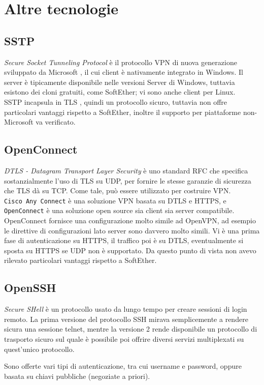 \section{Altre tecnologie}
\subsection{SSTP}
\textit{Secure Socket Tunneling Protocol} è il protocollo VPN di nuova generazione sviluppato
da Microsoft \cite{sstp}, il cui client è nativamente integrato in Windows. Il server è tipicamente
disponibile nelle versioni Server di Windows, tuttavia esistono dei cloni gratuiti, come
SoftEther; vi sono anche client per Linux.\\
SSTP incapsula in TLS , quindi un protocollo
sicuro, tuttavia non offre particolari vantaggi rispetto a SoftEther, inoltre il supporto
per piattaforme non-Microsoft va verificato.

\subsection{OpenConnect}
\textit{DTLS - Datagram Transport Layer Security} è uno standard RFC che specifica
sostanzialmente l'uso di TLS su UDP, per fornire le stesse garanzie di sicurezza che TLS dà
su TCP. Come tale, può essere utilizzato per costruire VPN.\\
\texttt{Cisco Any Connect} è una soluzione VPN basata su DTLS e HTTPS, e
\texttt{OpenConnect} è una soluzione open source sia client sia server compatibile.
OpenConnect fornisce una configurazione molto simile ad OpenVPN, ad esempio le direttive
di configurazioni lato server sono davvero molto simili. Vi è una prima fase di
autenticazione su HTTPS, il traffico poi è su DTLS, eventualmente si sposta su
HTTPS se UDP non è supportato. Da questo punto di vista non avevo rilevato particolari
vantaggi rispetto a SoftEther.


\subsection{OpenSSH}
\textit{Secure SHell} è un protocollo usato da lungo tempo per creare sessioni di login remoto.
La prima versione del protocollo SSH mirava semplicemente a rendere sicura una
sessione telnet, mentre la versione 2 rende disponibile un protocollo di trasporto
sicuro sul quale è possibile poi offrire diversi servizi multiplexati su quest'unico
protocollo.

Sono offerte vari tipi di autenticazione, tra cui username e password, oppure basata
su chiavi pubbliche (negoziate a priori).


